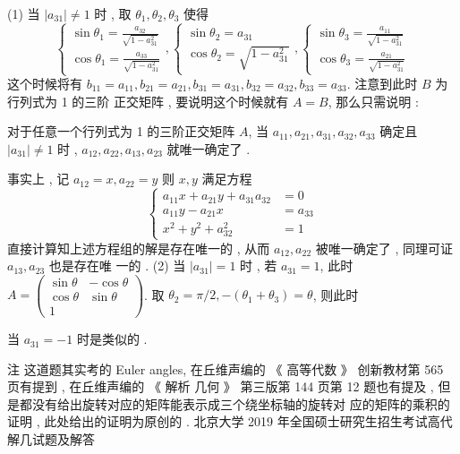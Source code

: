 \documentclass[10pt]{article}
\begin{document}
(1)  当  $\left|a_{31}\right| \neq 1$  时 ,  取  $\theta_{1}, \theta_{2}, \theta_{3}$  使得 
$$
\left\{\begin{array}{l}
\sin \theta_{1}=\frac{a_{32}}{\sqrt{1-a_{31}^{2}}} \\
\cos \theta_{1}=\frac{a_{33}}{\sqrt{1-a_{31}^{2}}}
\end{array},\left\{\begin{array}{l}
\sin \theta_{2}=a_{31} \\
\cos \theta_{2}=\sqrt{1-a_{31}^{2}}
\end{array},\left\{\begin{array}{l}
\sin \theta_{3}=\frac{a_{11}}{\sqrt{1-a_{31}^{2}}} \\
\cos \theta_{3}=\frac{a_{21}}{\sqrt{1-a_{31}^{2}}}
\end{array}\right.\right.\right.
$$
 这个时候将有  $b_{11}=a_{11}, b_{21}=a_{21}, b_{31}=a_{31}, b_{32}=a_{32}, b_{33}=a_{33}$.  注意到此时  $B$  为行列式为  1  的三阶   正交矩阵 ,  要说明这个时候就有  $A=B$,  那么只需说明 :

 对于任意一个行列式为  1  的三阶正交矩阵  $A$,  当  $a_{11}, a_{21}, a_{31}, a_{32}, a_{33}$  确定且  $\left|a_{31}\right| \neq 1$  时 , $a_{12}, a_{22}, a_{13}, a_{23}$  就唯一确定了 .

 事实上 ,  记  $a_{12}=x, a_{22}=y$  则  $x, y$  满足方程 
$$
\left\{\begin{aligned}
a_{11} x+a_{21} y+a_{31} a_{32} &=0 \\
a_{11} y-a_{21} x &=a_{33} \\
x^{2}+y^{2}+a_{32}^{2} &=1
\end{aligned}\right.
$$
 直接计算知上述方程组的解是存在唯一的 ,  从而  $a_{12}, a_{22}$  被唯一确定了 ,  同理可证  $a_{13}, a_{23}$  也是存在唯   一的 . (2)  当  $\left|a_{31}\right|=1$  时 ,  若  $a_{31}=1$,  此时  $A=\left(\begin{array}{cc}\sin \theta & -\cos \theta \\ \cos \theta & \sin \theta \\ 1\end{array}\right)$.  取  $\theta_{2}=\pi / 2,-\left(\theta_{1}+\theta_{3}\right)=\theta$,  则此时 


 当  $a_{31}=-1$  时是类似的 .

 注   这道题其实考的  Euler angles,  在丘维声编的 《 高等代数 》 创新教材第  565  页有提到 ,  在丘维声编的 《 解析   几何 》 第三版第  144  页第  12  题也有提及 , 但是都没有给出旋转对应的矩阵能表示成三个绕坐标轴的旋转对   应的矩阵的乘积的证明 ,  此处给出的证明为原创的 .  北京大学  2019  年全国硕士研究生招生考试高代解几试题及解答 
\end{document}
